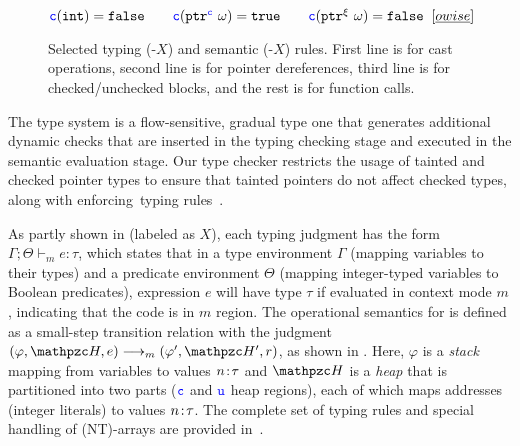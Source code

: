 \begin{DIFnomarkup}
\begin{figure*}[t]
{\begin{mathpar}
  \end{mathpar}
}
{\footnotesize
$
\cmode(\tint)=\texttt{false}
\qquad
\cmode(\tptr{\omega}{\cmode})=\texttt{true}
\qquad
\cmode(\tptr{\omega}{\xi})=\texttt{false}\;\;{[\emph{owise}]}
$
}
\caption{Selected typing (-$X$) and semantic (-$X$) rules. First line is for cast operations, second line is for pointer dereferences, third line is for checked/unchecked blocks, and the rest is for function calls.}
\label{fig:type-system-1}
\end{figure*}
\end{DIFnomarkup}

The \systemname type system is a flow-sensitive, gradual type one that generates additional dynamic checks that are inserted in the typing checking stage and executed in the semantic evaluation stage.
Our type checker restricts the usage of tainted and checked pointer types to ensure that tainted pointers do not affect checked types, along with enforcing~\checkedc typing rules~\cite{li22checkedc}.

As partly shown in  (labeled as $X$),
each typing judgment has the form $\Gamma;\Theta\vdash_m e : \tau$,
which states that in a type environment $\Gamma$ (mapping variables to
their types) and a predicate environment $\Theta$ (mapping integer-typed
variables to Boolean predicates), expression $e$ will have type $\tau$ if evaluated
in context mode $m$, indicating that the code is in $m$ region.
The operational semantics for \systemname is defined as a small-step
transition relation with the judgment $ (\varphi,\heap,e)
\longrightarrow_m (\varphi',\heap',r)$, as shown in .
 Here, $\varphi$ is a
\emph{stack} mapping from variables to values $\evalue{n}{\tau}$ and
$\heap$ is a \emph{heap} that is partitioned into two parts ($\cmode$ and $\umode$ heap regions), each of which
maps addresses (integer literals) to values $\evalue{n}{\tau}$.
The complete set of typing rules and special handling of (NT)-arrays are provided in~.

